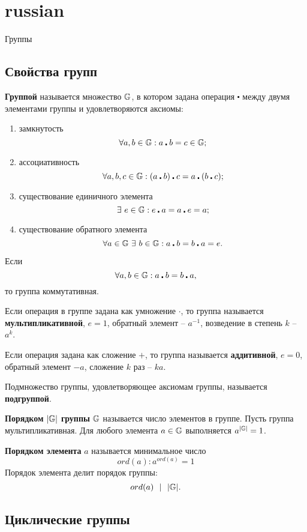\section{russian}{Группы}

\subsection{Свойства групп}

\textbf{Группой} называется множество $\mathbb{G}$, в котором задана операция $\centerdot$ между двумя элементами группы и удовлетворяются аксиомы:
\begin{enumerate}
    \item замкнутость
        \[ \forall a,b \in \mathbb{G}: a \centerdot b = c \in \mathbb{G}; \]
    \item ассоциативность
        \[ \forall a,b,c \in \mathbb{G}: (a \centerdot b) \centerdot c = a \centerdot (b \centerdot c); \]
    \item существование единичного элемента
        \[ \exists ~ e \in \mathbb{G}: e\centerdot a = a \centerdot e = a; \]
    \item существование обратного элемента
        \[ \forall a \in \mathbb{G} ~ \exists ~ b \in \mathbb{G}: a \centerdot b = b \centerdot a = e. \]
\end{enumerate}
Если
    \[ \forall a,b \in \mathbb{G}: a \centerdot b = b \centerdot a, \]
то группа коммутативная.

Если операция в группе задана как умножение $\cdot$, то группа называется \textbf{мультипликативной}, $e = 1$, обратный элемент -- $a^{-1}$, возведение в степень $k$ -- $a^k$.

Если операция задана как сложение $+$, то группа называется \textbf{аддитивной}, $e = 0$, обратный элемент $-a$, сложение $k$ раз -- $ka$.

Подмножество группы, удовлетворяющее аксиомам группы, называется \textbf{подгруппой}.

\textbf{Порядком} $|\mathbb{G}|$ \textbf{группы} $\mathbb{G}$ называется число элементов в группе. Пусть группа мультипликативная. Для любого элемента $a \in \mathbb{G}$ выполняется $a^{|\mathbb{G}|} = 1$.

\textbf{Порядком элемента} $a$ называется минимальное число
    \[ ord(a): a^{ord(a)} = 1 \]
 Порядок элемента делит порядок группы:
    \[ ord(a) ~~|~~ |\mathbb{G}|. \]


\subsection{Циклические группы}

